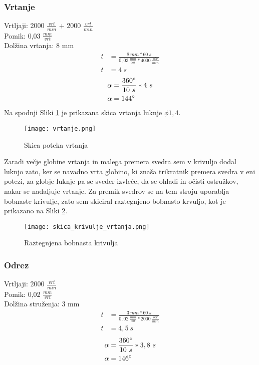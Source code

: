 \subsubsection{Vrtanje}
Vrtljaji: 2000 \( \frac{vrt}{min} \) + 2000 \( \frac{vrt}{min} \)\\
Pomik: 0,03 \( \frac{mm}{vrt} \) \\
Dolžina vrtanja: 8 mm
\begin{equation*}
	\begin{split}
		t &= \frac{8\ mm*60\ s}{0,03\ \frac{mm}{obr}*4000\ \frac{obr}{min}} \\
		t &= 4\ s
	\end{split}
\end{equation*}
\begin{equation*}
	\begin{split}
		\alpha &= \frac{360\degree}{10\ s} * 4\ s\\
		\alpha &= 144\degree
	\end{split}
\end{equation*}
Na spodnji Sliki \ref{vrtanje} je prikazana skica vrtanja
luknje $\phi 1,4$.
\begin{figure}[H]
	\begin{center}
		\texttt{[image: vrtanje.png]}
		\caption{Skica poteka vrtanja
			\cite{lasten}}
		\label{vrtanje}
	\end{center}
\end{figure}
Zaradi večje globine vrtanja in malega premera svedra
sem v krivuljo dodal luknjo zato, ker se navadno vrta globino, ki znaša trikratnik
premera svedra v eni potezi, za globje luknje pa se sveder
izvleče, da se ohladi in očisti ostružkov, nakar se nadaljuje vrtanje.
Za premik svedrov se na tem stroju uporablja bobnaste krivulje,
zato sem skiciral raztegnjeno bobnasto krvuljo, kot je prikazano
na Sliki \ref{raztegnjen_boben}.
\begin{figure}[H]
	\begin{center}
		\texttt{[image: skica\_krivulje\_vrtanja.png]}
		\caption{Raztegnjena bobnasta krivulja
			\cite{lasten}}
		\label{raztegnjen_boben}
	\end{center}
\end{figure}
\subsubsection{Odrez}
\label{izracun_odreza}
Vrtljaji: 2000 \( \frac{vrt}{min} \) \\
Pomik: 0,02 \( \frac{mm}{vrt} \) \\
Dolžina struženja: 3 mm
\begin{equation*}
	\begin{split}
		t &= \frac{3\ mm*60\ s}{0,02\ \frac{mm}{obr}*2000\ \frac{obr}{min}} \\
		t &= 4,5\ s
	\end{split}
\end{equation*}
\begin{equation*}
	\begin{split}
		\alpha &= \frac{360\degree}{10\ s} * 3,8\ s\\
		\alpha &= 146\degree
	\end{split}
\end{equation*}

